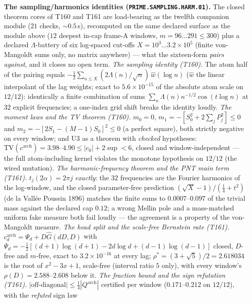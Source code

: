 \par\smallskip\noindent\textbf{The sampling/harmonics identities
(\texttt{PRIME.SAMPLING.HARM.01}).}
The closed theorem cores of T160 and T161 are load-bearing as the twelfth
companion module ($21$ checks, ${\sim}0.5$\,s), recomputed on the same
declared surface as the module above ($12$ deepest in-cap frame-A
windows, $m=96\ldots291\le300$) plus a declared $\Lambda$-battery of six
log-spaced cut-offs $X=10^{3}\ldots3.2\times10^{5}$ (finite von-Mangoldt
sums only, no matrix anywhere) --- what the sixteen-form \emph{pairs
against}, and it closes no open term.
\emph{The sampling identity (T160).} The atom half of the pairing equals
$-\tfrac12\sum_{n\le X}(2\Lambda(n)/\sqrt n)\,\widehat w(\log n)$
($\widehat w$ the linear interpolant of the lag weights; exact to
$5.6\times10^{-15}$ of the absolute atom scale on $12/12$): identically a
finite combination of sums $\sum_n\Lambda(n)n^{-1/2}\cos(t\log n)$ at
$32$ explicit frequencies; a one-index grid shift breaks the identity
loudly.
\emph{The moment laws and the TV theorem (T160).} $m_0=0$,
$m_1=-[S_0^2+2\sum_jP_j^2]\le0$ and $m_2=-[2S_1-(M{-}1)S_0]^2\le0$ (a
perfect square), both strictly negative on every window; and U3 as a
theorem with \emph{checked} hypotheses:
$\mathrm{TV}(c^{\mathrm{arch}})=3.98$--$4.90\le|c_0|+2\sup<6$, closed and
window-independent --- the full atom-including kernel violates the
monotone hypothesis on $12/12$ (the wired mutation).
\emph{The harmonic-frequency theorem and the PNT main term (T161).}
$t_j(2\alpha)=2\pi j$ \emph{exactly}: the $32$ frequencies are the
Fourier harmonics of the log-window, and the closed parameter-free
prediction $(\sqrt X-1)/(\tfrac14+t^2)$ (de la Vall\'ee Poussin 1896)
matches the finite sums to $0.0007$--$0.097$ of the trivial mass against
the declared cap $0.12$; a wrong Mellin pole and a mass-matched uniform
fake measure both fail loudly --- the agreement is a property of the
von-Mangoldt measure.
\emph{The head split and the scale-free Bernstein rate (T161).}
$c^{\mathrm{arch}}_d=\Psi_d+D\widehat G(dD,D)$ with
$\Psi_d=-\tfrac12[(d{+}1)\log(d{+}1)-2d\log d+(d{-}1)\log(d{-}1)]$
closed, $D$-free and $m$-free, exact to $3.2\times10^{-16}$ at every lag;
$\rho^*=(3+\sqrt5)/2=2.618034$ is the root of $x^2-3x+1$, scale-free
(interval ratio $5$ only), with every window's $\rho(D)=2.588$--$2.608$
below it.
\emph{The fraction bound and the sign refutation (T161).}
$|\text{off-diagonal}|\le\tfrac14|Q^{\mathrm{arch}}|$ certified per
window ($0.171$--$0.212$ on $12/12$), with the \emph{refuted} sign law
